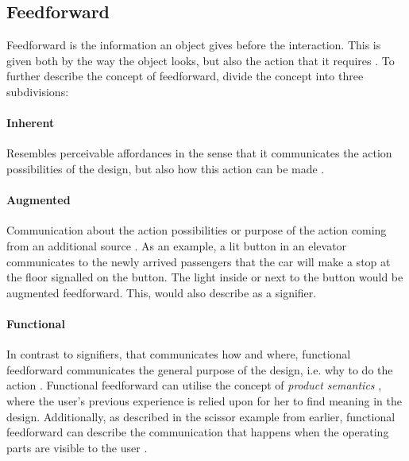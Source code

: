 \subsection{Feedforward} Feedforward is the information an object gives before the interaction. This is given both by the way the object looks, but also the action that it requires \cite{frogger}. To further describe the concept of feedforward,  divide the concept into three subdivisions:
\paragraph{Inherent} Resembles perceivable affordances \cite{norman} in the sense that it communicates the action possibilities of the design, but also how this action can be made \cite{frogger}.
\paragraph{Augmented} Communication about the action possibilities or purpose of the action coming from an additional source \cite{frogger}. As an example, a lit button in an elevator communicates to the newly arrived passengers that the car will make a stop at the floor signalled on the button. The light inside or next to the button would be augmented feedforward. This,  would also describe as a signifier.
\paragraph{Functional} In contrast to signifiers, that communicates how and where, functional feedforward communicates the general purpose of the design, i.e. why to do the action \cite{frogger}. Functional feedforward can utilise the concept of \textit{product semantics} \cite{semantics}, where the user's previous experience is relied upon for her to find meaning in the design. Additionally, as described in the scissor example from earlier, functional feedforward can describe the communication that happens when the operating parts are visible to the user \cite{frogger}.

